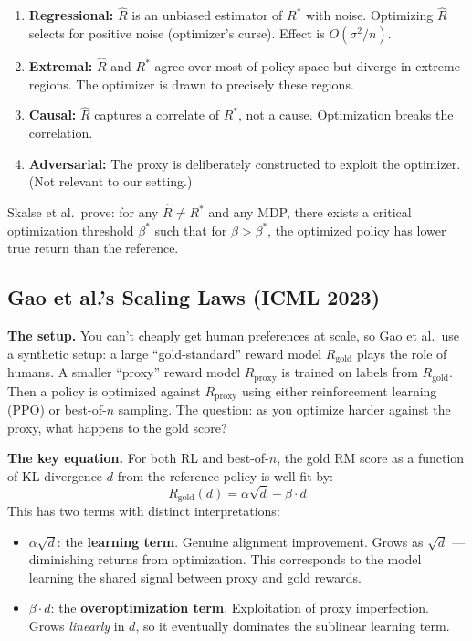 \documentclass[11pt]{article}
\begin{document}
\begin{enumerate}
  \item \textbf{Regressional:} $\hat{R}$ is an unbiased estimator of
    $R^*$ with noise. Optimizing $\hat{R}$ selects for positive noise
    (optimizer's curse). Effect is $O(\sigma^2/n)$.

  \item \textbf{Extremal:} $\hat{R}$ and $R^*$ agree over most of
    policy space but diverge in extreme regions. The optimizer is drawn
    to precisely these regions.

  \item \textbf{Causal:} $\hat{R}$ captures a correlate of $R^*$,
    not a cause. Optimization breaks the correlation.

  \item \textbf{Adversarial:} The proxy is deliberately constructed to
    exploit the optimizer. (Not relevant to our setting.)
\end{enumerate}

Skalse et al.\ prove: for any $\hat{R} \neq R^*$ and any MDP, there
exists a critical optimization threshold $\beta^*$ such that for
$\beta > \beta^*$, the optimized policy has lower true return than
the reference.

\subsection{Gao et al.'s Scaling Laws (ICML 2023)}

\textbf{The setup.} You can't cheaply get human preferences at scale, so
Gao et al.\ use a synthetic setup: a large ``gold-standard'' reward model
$R_{\text{gold}}$ plays the role of humans. A smaller ``proxy'' reward
model $R_{\text{proxy}}$ is trained on labels from $R_{\text{gold}}$.
Then a policy is optimized against $R_{\text{proxy}}$ using either
reinforcement learning (PPO) or best-of-$n$ sampling. The question: as
you optimize harder against the proxy, what happens to the gold score?

\textbf{The key equation.} For both RL and best-of-$n$, the gold RM
score as a function of KL divergence $d$ from the reference policy is
well-fit by:
\begin{equation}
  R_{\text{gold}}(d) = \alpha \sqrt{d} - \beta \cdot d
  \label{eq:gao}
\end{equation}
This has two terms with distinct interpretations:
\begin{itemize}
  \item $\alpha\sqrt{d}$: the \textbf{learning term}. Genuine alignment
    improvement. Grows as $\sqrt{d}$ --- diminishing returns from
    optimization. This corresponds to the model learning the shared
    signal between proxy and gold rewards.

  \item $\beta \cdot d$: the \textbf{overoptimization term}. Exploitation
    of proxy imperfection. Grows \emph{linearly} in $d$, so it
    eventually dominates the sublinear learning term.
\end{itemize}
\end{document}
